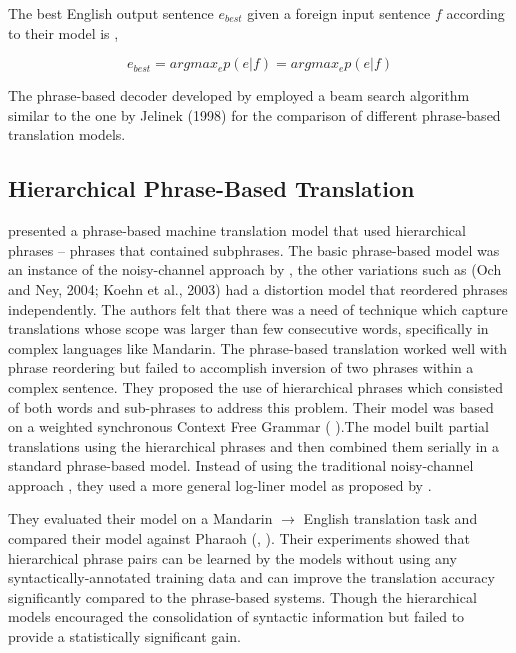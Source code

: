 The best English output sentence $e_{best}$ given a foreign input sentence $f$ according to their model is ,

$$
 e_{best}= argmax_ep(e|f)
         = argmax_ep(e|f)
$$

The phrase-based decoder developed by \cite{Koehn:2003:SPT:1073445.1073462} employed a beam search algorithm similar to the one by Jelinek (1998)  for the comparison of different phrase-based translation models.

\subsection{Hierarchical Phrase-Based Translation}

\cite{Chiang:2005:HPM:1219840.1219873} presented a  phrase-based machine translation model that used hierarchical phrases – phrases that contained subphrases. The basic phrase-based model was an instance of the noisy-channel approach by \cite{Brown:1993:MSM:972470.972474}, the other variations such as (Och and Ney, 2004; Koehn et al., 2003) had a distortion model that reordered phrases independently. The authors felt that there was a need of technique which capture translations whose scope was larger than few consecutive words, specifically in complex languages like Mandarin. The phrase-based translation worked well with phrase reordering but failed to accomplish inversion of two phrases within a complex sentence. They proposed the use of hierarchical phrases which consisted of both words and sub-phrases to address this problem. Their model was based on a weighted synchronous Context Free Grammar ( \cite{Aho:1969:SDT:1739930.1740037}).The model built partial translations using the hierarchical phrases and then combined them serially in a standard phrase-based model.  Instead of using the traditional noisy-channel approach , they used a more general log-liner model as proposed by \cite{Och:2002:DTM:1073083.1073133}.

They evaluated their model on a Mandarin $\rightarrow$ English translation task and compared their model against Pharaoh (\citeauthor{10.1007/978-3-540-30194-3_13}, \citeyear{10.1007/978-3-540-30194-3_13}). Their experiments showed that hierarchical phrase pairs can be learned by the models without using any syntactically-annotated training data and can improve the translation accuracy significantly compared to the phrase-based systems. Though the hierarchical models encouraged the consolidation of syntactic information but failed to provide a statistically significant gain.

